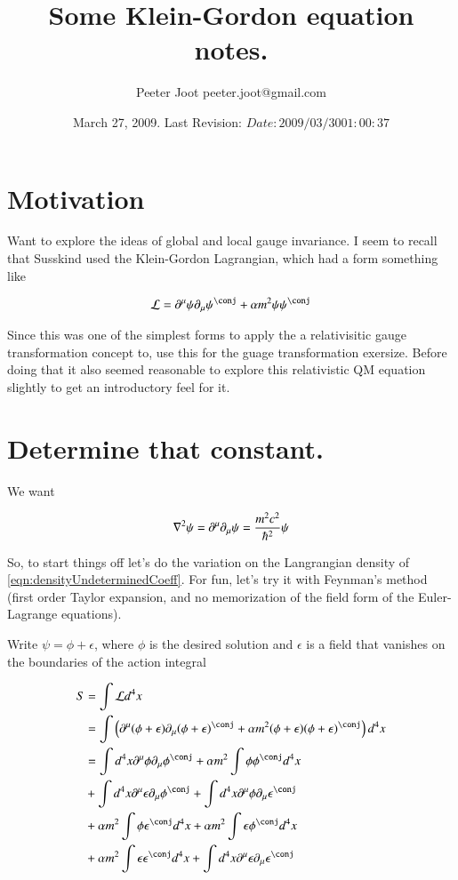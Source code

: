 \documentclass{article}
\title{ Some Klein-Gordon equation notes. }
\author{Peeter Joot \quad peeter.joot@gmail.com }
\date{ March 27, 2009.  Last Revision: $Date: 2009/03/30 01:00:37 $ }
\begin{document}
\maketitle{}
\tableofcontents
\section{ Motivation }

Want to explore the ideas of global and local gauge invariance.  I seem to recall that Susskind
used the Klein-Gordon Lagrangian, which had a form something like

\begin{align}\label{eqn:densityUndeterminedCoeff}
\LL = \partial^\mu \psi \partial_\mu \psi^\conj + \alpha m^2 \psi \psi^\conj
\end{align}

Since this was one of the simplest forms to apply the
a relativisitic gauge transformation concept to, use this for the guage transformation exersize.  Before doing that it also seemed reasonable to
explore this relativistic QM equation slightly to get an introductory feel for it.

\section{ Determine that constant. }

We want

\begin{align*}
\nabla^2 \psi = \partial^\mu \partial_\mu \psi = \frac{m^2 c^2}{\hbar^2} \psi
\end{align*}

So, to start things off let's do the variation on the Langrangian density of \ref{eqn:densityUndeterminedCoeff}.  For fun, let's try it with Feynman's method (first order Taylor expansion, and no memorization
of the field form of the Euler-Lagrange equations).

Write $\psi = \phi + \epsilon$, where $\phi$ is the desired solution and $\epsilon$ is a field that
vanishes on the boundaries of the action integral

\begin{align*}
S
&= \int \LL d^4 x \\
&=
\int \left( \partial^\mu (\phi + \epsilon) \partial_\mu (\phi + \epsilon)^\conj + \alpha m^2 (\phi + \epsilon) (\phi + \epsilon)^\conj \right) d^4 x \\
&=
\int d^4 x \partial^\mu \phi \partial_\mu \phi^\conj
+ \alpha m^2 \int \phi \phi^\conj  d^4 x \\
&+ \int d^4 x \partial^\mu \epsilon \partial_\mu \phi^\conj
+ \int d^4 x \partial^\mu \phi \partial_\mu \epsilon^\conj  \\
&+ \alpha m^2 \int \phi \epsilon^\conj  d^4 x
+ \alpha m^2 \int \epsilon \phi^\conj  d^4 x \\
&+ \alpha m^2 \int \epsilon \epsilon^\conj  d^4 x
+ \int d^4 x \partial^\mu \epsilon \partial_\mu \epsilon^\conj \\
\end{align*}
\end{document}
